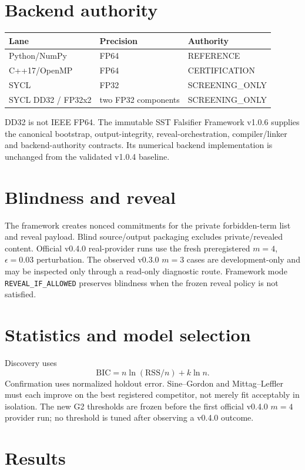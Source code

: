 \documentclass[11pt,a4paper]{article}
\newcommand{\code}[1]{\texttt{#1}}
\begin{document}
\section{Backend authority}
\begin{longtable}{lll}\toprule Lane & Precision & Authority\\\midrule
Python/NumPy & FP64 & REFERENCE\\
C++17/OpenMP & FP64 & CERTIFICATION\\
SYCL & FP32 & SCREENING\_ONLY\\
SYCL DD32 / FP32x2 & two FP32 components & SCREENING\_ONLY\\\bottomrule\end{longtable}
DD32 is not IEEE FP64. The immutable SST Falsifier Framework v1.0.6 supplies the canonical bootstrap, output-integrity, reveal-orchestration, compiler/linker and backend-authority contracts. Its numerical backend implementation is unchanged from the validated v1.0.4 baseline.

\section{Blindness and reveal}
The framework creates nonced commitments for the private forbidden-term list and reveal payload. Blind source/output packaging excludes private/revealed content. Official v0.4.0 real-provider runs use the fresh preregistered $m=4$, $\epsilon=0.03$ perturbation. The observed v0.3.0 $m=3$ cases are development-only and may be inspected only through a read-only diagnostic route. Framework mode \code{REVEAL\_IF\_ALLOWED} preserves blindness when the frozen reveal policy is not satisfied.

\section{Statistics and model selection}
Discovery uses
\[
\mathrm{BIC}=n\ln(\mathrm{RSS}/n)+k\ln n.
\]
Confirmation uses normalized holdout error. Sine--Gordon and Mittag--Leffler must each improve on the best registered competitor, not merely fit acceptably in isolation. The new G2 thresholds are frozen before the first official v0.4.0 $m=4$ provider run; no threshold is tuned after observing a v0.4.0 outcome.

\section{Results}
\end{document}
